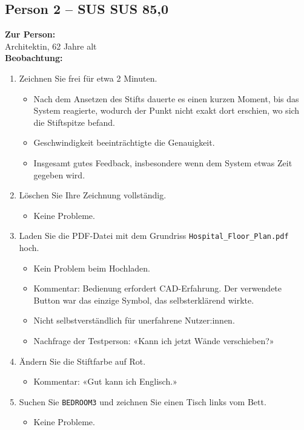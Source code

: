 \subsection{Person 2 – SUS SUS 85{,}0}
\textbf{Zur Person:}\\
Architektin, 62 Jahre alt\\

\textbf{Beobachtung:}
\begin{enumerate}
    \item Zeichnen Sie frei für etwa 2 Minuten.
    \begin{itemize}
        \item Nach dem Ansetzen des Stifts dauerte es einen kurzen Moment, bis das System reagierte, wodurch der Punkt nicht exakt dort erschien, wo sich die Stiftspitze befand.
        \item Geschwindigkeit beeinträchtigte die Genauigkeit.
        \item Insgesamt gutes Feedback, insbesondere wenn dem System etwas Zeit gegeben wird.
    \end{itemize}

    \item Löschen Sie Ihre Zeichnung vollständig.
    \begin{itemize}
        \item Keine Probleme.
    \end{itemize}

    \item Laden Sie die PDF-Datei mit dem Grundriss \texttt{Hospital\_Floor\_Plan.pdf} hoch.
    \begin{itemize}
        \item Kein Problem beim Hochladen.
        \item Kommentar: Bedienung erfordert CAD-Erfahrung. Der verwendete Button war das einzige Symbol, das selbsterklärend wirkte.
        \item Nicht selbstverständlich für unerfahrene Nutzer:innen.
        \item Nachfrage der Testperson: «Kann ich jetzt Wände verschieben?»
    \end{itemize}

    \item Ändern Sie die Stiftfarbe auf Rot.
    \begin{itemize}
        \item Kommentar: «Gut kann ich Englisch.»
    \end{itemize}

    \item Suchen Sie \texttt{BEDROOM3} und zeichnen Sie einen Tisch links vom Bett.
    \begin{itemize}
        \item Keine Probleme.
    \end{itemize}


\end{enumerate}
